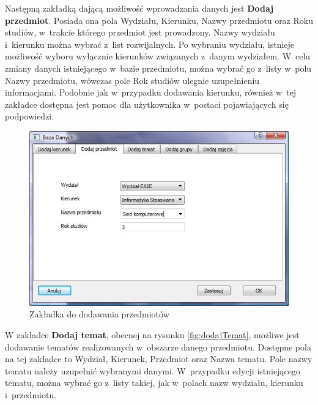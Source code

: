 Następną zakładką dającą możliwość wprowadzania danych jest \textbf{Dodaj przedmiot}. Posiada ona pola Wydziału, Kierunku, Nazwy przedmiotu oraz Roku studiów, w~trakcie którego przedmiot jest prowadzony. Nazwy wydziału i~kierunku można wybrać z~list rozwijalnych. Po wybraniu wydziału, istnieje możliwość wyboru wyłącznie kierunków związanych z~danym wydziałem. W~celu zmiany danych istniejącego w~bazie przedmiotu, można wybrać go z~listy w~polu Nazwy przedmiotu, wówczas pole Rok studiów ulegnie uzupełnieniu informacjami. Podobnie jak w~przypadku dodawania kierunku, również w~tej zakładce dostępna jest pomoc dla użytkownika w~postaci pojawiających się podpowiedzi. 

\begin{figure}
\begin{center}
\includegraphics[scale=0.7]{dodaj_przedmiot.jpg}
\caption{Zakładka do dodawania przedmiotów}
\label{fig:dodajPrzedmiot}
\end{center}
\end{figure}

W zakładce \textbf{Dodaj temat}, obecnej na rysunku \ref{fig:dodajTemat}, możliwe jest dodawanie tematów realizowanych w~obszarze danego przedmiotu. Dostępne pola na tej zakładce to Wydział, Kierunek, Przedmiot oraz Nazwa tematu. Pole nazwy tematu należy uzupełnić wybranymi danymi. W~przypadku edycji istniejącego tematu, można wybrać go z~listy takiej, jak w~polach nazw wydziału, kierunku i~przedmiotu.

